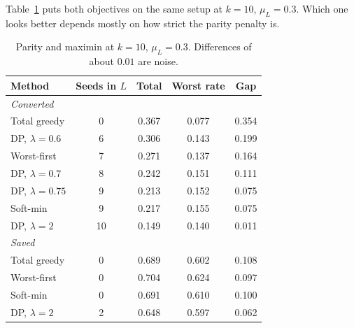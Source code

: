 
Table~\ref{tab:compare} puts both objectives on the same setup at $k=10$, $\mu_L=0.3$. Which one looks better depends mostly on how strict the parity penalty is.

\begin{table}[H]
\centering
\small
\setlength{\tabcolsep}{4pt}
\begin{tabular}{lcccc}
\hline
Method & Seeds in $L$ & Total & Worst rate & Gap \\
\hline
\multicolumn{5}{l}{\emph{Converted}} \\
Total greedy & 0 & 0.367 & 0.077 & 0.354 \\
DP, $\lambda=0.6$ & 6 & 0.306 & 0.143 & 0.199 \\
Worst-first & 7 & 0.271 & 0.137 & 0.164 \\
DP, $\lambda=0.7$ & 8 & 0.242 & 0.151 & 0.111 \\
DP, $\lambda=0.75$ & 9 & 0.213 & 0.152 & 0.075 \\
Soft-min & 9 & 0.217 & 0.155 & 0.075 \\
DP, $\lambda=2$ & 10 & 0.149 & 0.140 & 0.011 \\
\hline
\multicolumn{5}{l}{\emph{Saved}} \\
Total greedy & 0 & 0.689 & 0.602 & 0.108 \\
Worst-first & 0 & 0.704 & 0.624 & 0.097 \\
Soft-min & 0 & 0.691 & 0.610 & 0.100 \\
DP, $\lambda=2$ & 2 & 0.648 & 0.597 & 0.062 \\
\hline
\end{tabular}
\caption{Parity and maximin at $k=10$, $\mu_L=0.3$. Differences of about $0.01$ are noise.}
\label{tab:compare}
\end{table}

